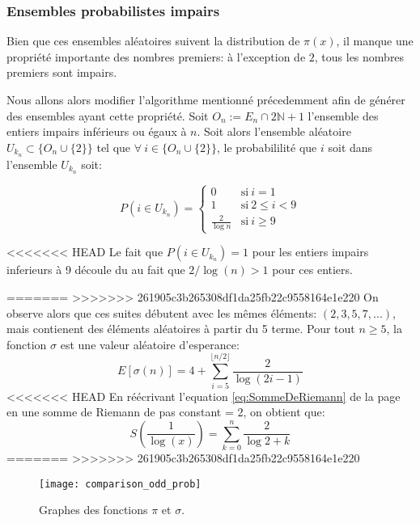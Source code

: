 \documentclass[../main.tex]{report}
\begin{document}
    \label{sec:odd_prob}
\subsubsection{Ensembles probabilistes impairs}
Bien que ces ensembles aléatoires suivent la distribution de $\pi(x)$, il manque une propriété importante des nombres premiers: à l'exception de $2$, tous les nombres premiers sont impairs.

Nous allons alors modifier l'algorithme mentionné précedemment afin de générer des ensembles ayant cette propriété. 
Soit $O_n := E_n \cap 2 \mathbb{N} +1$ l'ensemble des entiers impairs inférieurs ou égaux à $n$. 
Soit alors l'ensemble aléatoire 
$U_{k_n} \subset \{O_n \cup \{2\}\}$
tel que $\forall~i \in \{O_n \cup \{2\}\}$, le probabililité que $i$ soit dans l'ensemble $U_{k_n}$ soit:

\[
P(i \in U_{k_n}) = 
\left\{ 
    \begin{array}{cl}
         0 & \mbox{si}~i = 1 \\
         1 & \mbox{si}~ 2 \leq i < 9 \\
         \frac{2}{\log n} & \mbox{si}~i \geq 9
    \end{array}
\right.
\]

<<<<<<< HEAD
Le fait que $P(i \in U_{k_n}) = 1$ pour les entiers impairs inferieurs à 9 découle du au fait que $2/\log(n) > 1$ pour ces entiers.

=======
>>>>>>> 261905c3b265308df1da25fb22c9558164e1e220
On observe alors que ces suites débutent avec les mêmes éléments: $ (2,3,5,7,...) $, mais contienent des éléments aléatoires à partir du 5 terme. 
Pour tout $n \geq 5$, la fonction $\sigma$ est une valeur aléatoire d'esperance: 
\[
E[\sigma(n)] = 
4 + \sum_{i=5}^{\lfloor{n/2}\rfloor} \frac{2}{\log (2i-1)}
\]
<<<<<<< HEAD
En réécrivant l'equation \ref{eq:SommeDeRiemann} de la page \pageref{eq:SommeDeRiemann} en une somme de Riemann de pas constant = 2, on obtient que:
\[
S(\frac{1}{\log(x)}) = \sum_{k=0}^{n}\frac{2}{\log 2+k}
\]
=======
>>>>>>> 261905c3b265308df1da25fb22c9558164e1e220

\begin{figure}[H]
\texttt{[image: comparison\_odd\_prob]}

\caption{Graphes des fonctions $\pi$ et $\sigma$.}
\label{fig:comparison_sigma_prob}
\end{figure}
\end{document}
